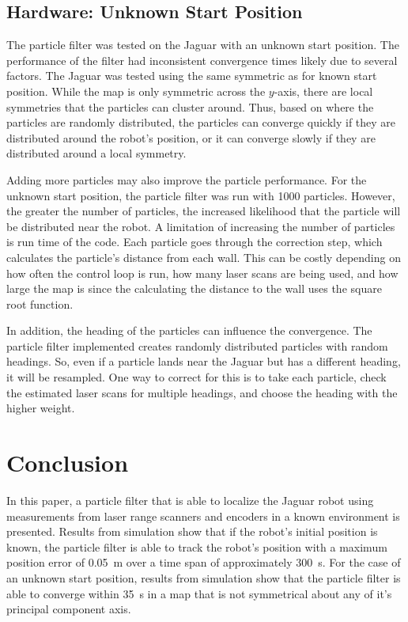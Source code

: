 \documentclass[conference]{../IEEEtran}
\begin{document}
\subsection{Hardware: Unknown Start Position}
The particle filter was tested on the Jaguar with an unknown start position.  The
performance of the filter had inconsistent convergence times likely due to several
factors.  The Jaguar was tested using the same symmetric as for known start position.
While the map is only symmetric across the $y$-axis, there are local symmetries that the
particles can cluster around.  Thus, based on where the particles are randomly
distributed, the particles can converge quickly if they are distributed around the robot's
position, or it can converge slowly if they are distributed around a local symmetry.

Adding more particles may also improve the particle performance.  For the unknown start
position, the particle filter was run with 1000 particles.  However, the greater the
number of particles, the increased likelihood that the particle will be distributed near
the robot.  A limitation of increasing the number of particles is run time of the code.
Each particle goes through the correction step, which calculates the particle's distance
from each wall.  This can be costly depending on how often the control loop is run, how
many laser scans are being used, and how large the map is since the calculating the
distance to the wall uses the square root function.

In addition, the heading of the particles can influence the convergence.  The particle
filter implemented creates randomly distributed particles with random headings.  So, even
if a particle lands near the Jaguar but has a different heading, it will be resampled.
One way to correct for this is to take each particle, check the estimated laser scans for
multiple headings, and choose the heading with the higher weight.

\addtolength{\textheight}{-20cm}


\section{Conclusion}
In this paper, a particle filter that is able to localize the Jaguar robot using
measurements from laser range scanners and encoders in a known environment is presented.
Results from simulation show that if the robot's initial position is known, the particle
filter is able to track the robot's position with a maximum position error of
\SI{0.05}{\meter} over a time span of approximately \SI{300}{\second}.  For the case of an
unknown start position, results from simulation show that the particle filter is able to
converge within \SI{35}{\second} in a map that is not symmetrical about any of it's
principal component axis.
\end{document}
